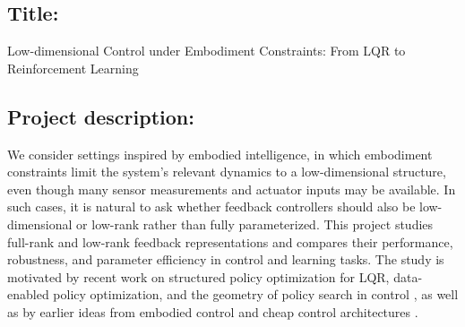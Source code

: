 \documentclass[a4paper,11pt]{article}
\begin{document}

\subsection*{Title:} Low-dimensional Control under Embodiment Constraints: From LQR to Reinforcement Learning

\subsection*{Project description:}
We consider settings inspired by embodied intelligence, in which embodiment constraints limit the system’s relevant dynamics to a low-dimensional structure, even though many sensor measurements and actuator inputs may be available. In such cases, it is natural to ask whether feedback controllers should also be low-dimensional or low-rank rather than fully parameterized. This project studies full-rank and low-rank feedback representations and compares their performance, robustness, and parameter efficiency in control and learning tasks. The study is motivated by recent work on structured policy optimization for LQR, data-enabled policy optimization, and the geometry of policy search in control \cite{park2020structured,zhao2023deePO,talebi2024policy}, as well as by earlier ideas from embodied control and cheap control architectures \cite{ay2015geometric,montufar2015cheap,montufar2015geometry}.
\end{document}
